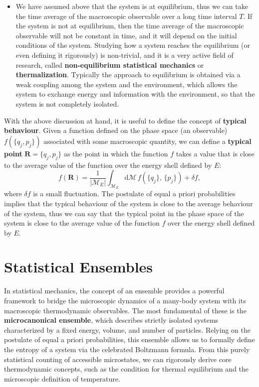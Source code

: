 \begin{itemize}
    \item We have assumed above that the system is at equilibrium, thus we can take the time average of the macroscopic observable over a long time interval \(T\). If the system is not at equilibrium, then the time average of the macroscopic observable will not be constant in time, and it will depend on the initial conditions of the system. Studying how a system reaches the equilibrium (or even defining it rigorously) is non-trivial, and it is a very active field of research, called \textbf{non-equilibrium statistical mechanics} or \textbf{thermalization}. Typically the approach to equilibrium is obtained via a weak coupling among the system and the environment, which allows the system to exchange energy and information with the environment, so that the system is not completely isolated.
\end{itemize}

With the above discussion at hand, it is useful to define the concept of \textbf{typical behaviour}. Given a function defined on the phase space (an observable) \(f(\{q_j, p_j\})\) associated with some macroscopic quantity, we can define a \textbf{typical point} \(\mathbf{R} = \{q_j,p_j\}\) as the point in which the function \(f\) takes a value that is close to the average value of the function over the energy shell defined by \(E\):
\begin{equation}
    f(\mathbf{R}) = \frac{1}{|\mathcal{M}_E|} \int_{\mathcal{M}_E} \mathrm{d} \mathcal{M} \, f(\{q_j\},\,\{p_j\}) + \delta f,
    \label{eq:typical_point}
\end{equation}
where \(\delta f\) is a small fluctuation. The postulate of equal a priori probabilities implies that the typical behaviour of the system is close to the average behaviour of the system, thus we can say that the typical point in the phase space of the system is close to the average value of the function \(f\) over the energy shell defined by \(E\).

\section{Statistical Ensembles}

In statistical mechanics, the concept of an ensemble provides a powerful framework to bridge the microscopic dynamics of a many-body system with its macroscopic thermodynamic observables. The most fundamental of these is the \textbf{microcanonical ensemble}, which describes strictly isolated systems characterized by a fixed energy, volume, and number of particles. Relying on the postulate of equal a priori probabilities, this ensemble allows us to formally define the entropy of a system via the celebrated Boltzmann formula. From this purely statistical counting of accessible microstates, we can rigorously derive core thermodynamic concepts, such as the condition for thermal equilibrium and the microscopic definition of temperature.

